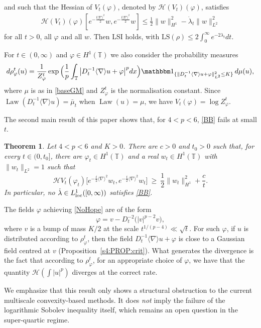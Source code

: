 \documentclass[letterpaper, 11pt,  reqno]{amsart}
\newtheorem{theorem}{Theorem} [section]
\theoremstyle{definition}
\DeclareMathOperator{\Law}{Law}
\newcommand{\1}{\mathbbm 1}
\newcommand{\noi}{\noindent}
\newcommand{\T}{\mathbb{T}}
\renewcommand{\H}{\mathcal H}
\newcommand{\0}{\mathbf 0}
\newcommand{\nb}{\nabla}
\newcommand{\vp}{\varphi}
\newcommand{\ld}{\lambda}
\newcommand{\jb}[1]
{\langle #1 \rangle}
\newcommand{\ph}{\varphi}
\renewcommand{\H}{\mathcal{H}}
\numberwithin{equation}{section}
\numberwithin{theorem}{section}
\begin{document}
 
\noi
and such that the Hessian of $ V_t(\vp)$,
denoted by $\mathcal{H}(V_t)(\vp)$, satisfies
\begin{align}
    \mathcal{H}(V_t)(\vp)[e^{-\frac{t\jb{\nb}^2}{2}}w, e^{-\frac{t\jb{\nb}^2}{2}}w] \le  \frac 12 \| w \|_{H^1}^2
    - \dot \ld_t \| w \|_{L^2}^2
    \label{BB}
\end{align}
for all $t>0$, all $\ph$ and all $w$. Then LSI holds, with
$\mathrm{LS}(\rho)\le2\int_0^\infty e^{-2\ld_t}dt$.
 
 
 
For $t\in(0,\infty)$ and $\ph\in H^1(\T)$ we also consider the probability measures
\begin{equation}\label{rhotphdef}
d\rho^t_\ph(u)=\frac1{Z^t_\ph}\exp\Big(\frac1p\int_\T\big|D_t^{-1}\jb\nb u+\ph\big|^pdx\Big)\1_{\{\|D_t^{-1}\jb\nb u+\ph\|_{L^2}^2\le K\}}\,d\mu(u),
\end{equation}
where $\mu$ is as in \eqref{baseGM} and $Z^t_\ph$ is the normalisation constant. Since
$\Law(D_t^{-1}\jb\nb u)=\bar\mu_t$ when $\Law(u)=\mu$, we have $V_t(\ph)=\log Z^t_\ph$.
 
The second main result of this paper shows that, for $4<p<6$, \eqref{BB} fails at
small $t$.
 
\begin{theorem}\label{thm:noLS}
Let $4<p<6$ and $K>0$. There are $c>0$ and $t_0>0$ such that, for every $t\in(0,t_0]$, there
are $\ph_t\in H^1(\T)$ and a real $w_t\in H^1(\T)$ with $\|w_t\|_{L^2}=1$ such that
\begin{equation}\label{NoHope}
\H V_t(\ph_t)\big[e^{-\frac t2\jb\nb^2}w_t,e^{-\frac t2\jb\nb^2}w_t\big]
\ \ge\ \frac12\|w_t\|_{H^1}^2+\frac ct.
\end{equation}
In particular, no $\dot\ld\in L^1_{\rm loc}([0,\infty))$ satisfies \eqref{BB}.
\end{theorem}
 
The fields $\ph$ achieving \eqref{NoHope} are of the form
\[
\ph=v-D_t^{-2}\big(|v|^{p-2}v\big),
\]
where $v$ is a bump of mass $K/2$ at the scale $t^{1/(p-4)}\ll\sqrt t$. For such $\ph$,
if $u$ is distributed according to $\rho^t_\ph$, then the field
$D_t^{-1}\jb\nb u+\ph$ is close to a Gaussian field centred at $v$
(Proposition~\ref{s4:PROP:crit}). What generates the divergence is the fact that according to $\rho^t_\ph$, for an appropriate choice of $\ph$, we have that the quantity $\mathcal H(\int |u|^p)$ diverges at the correct rate.
 
We emphasize
that this result only shows a structural obstruction to the current
multiscale convexity-based methods.
It does \emph{not} imply the failure of the logarithmic Sobolev inequality itself,
which remains an open question in the super-quartic regime.
 
\end{document}
